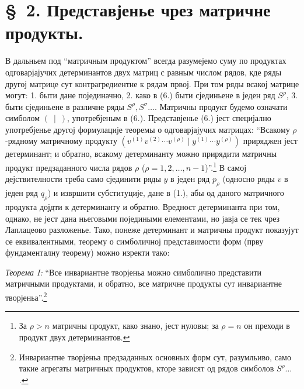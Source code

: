 \documentclass[11pt]{article}
\begin{document}
\section*{\S\ 2. Представјенье чрез матричне продукты.}

В дальньем под ``матричным продуктом'' всегда разумејемо суму по продуктах одговарјајучих детерминантов двух матриц с равным числом рядов, кде ряды другој матрице сут контрагредиентне к рядам првој. При том ряды всакој матрице могут: 1. быти дане појединачно, 2. како в (6.) быти сјединьене в једен ряд $S^\rho$, 3. быти сјединьене в различне ряды $S^\rho,S^\sigma\ldots$. Матричны продукт будемо означати симболом $(\ \mid\ )$, употребјеным в (6.). Представјенье (6.) јест специјално употребјенье другој формулације теоремы о одговарјајучих матрицах: ``Всакому $\rho$-рядному матричному продукту $(v^{(1)}v^{(2)}\cdots v^{(\rho)}\mid y^{(1)}\cdots y^{(\rho)})$ приряджен јест детерминант; и обратно, всакому детерминанту можно прирядити матричны продукт предзаданного числа рядов $\rho$ ($\rho=1,2,\ldots,n-1$)''.\footnote{За $\rho>n$ матричны продукт, како знано, јест нуловы; за $\rho=n$ он преходи в продукт двух детерминантов.} В самој дејствителности треба само сјединити ряды $y$ в једен ряд $p_\rho$ (односно ряды $v$ в једен ряд $q_\rho$) и извршити субституције, дане в (1.), абы од даного матричного продукта дојдти к детерминанту и обратно. Вредност детерминанта при том, однако, не јест дана ньеговыми поједиными елементами, но јавја се тек чрез Лаплацеово разложенье. Тако, понеже детерминант и матричны продукт показујут се еквивалентными, теорему о симболичној представимости форм (прву фундаменталну теорему) можно изректи тако:

\emph{Теорема I:} ``Все инвариантне творјеньа можно симболично представити матричными продуктами, и обратно, все матричне продукты сут инвариантне творјеньа''.\footnote{Инвариантне творјеньа предзаданных основных форм сут, разумльиво, само такие агрегаты матричных продуктов, кторе зависят од рядов симболов $S^\rho\ldots$.}
\end{document}
